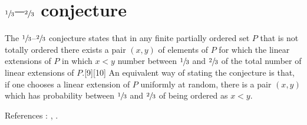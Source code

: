 \section{$\sfrac{1}{3}$--$\sfrac{2}{3}$ conjecture}

The $\sfrac{1}{3}$--$\sfrac{2}{3}$ conjecture states that in any finite partially ordered set $P$ that is not totally ordered there exists a pair $(x,y)$ of elements of $P$ for which the linear extensions of $P$ in which $x < y$ number between $\sfrac{1}{3}$ and $\sfrac{2}{3}$ of the total number of linear extensions of $P$.[9][10] An equivalent way of stating the conjecture is that, if one chooses a linear extension of $P$ uniformly at random, there is a pair $(x,y)$ which has probability between $\sfrac{1}{3}$ and $\sfrac{2}{3}$ of being ordered as $x < y$.


References : \cite{kral2013new}, \cite{zaguia20111}.
